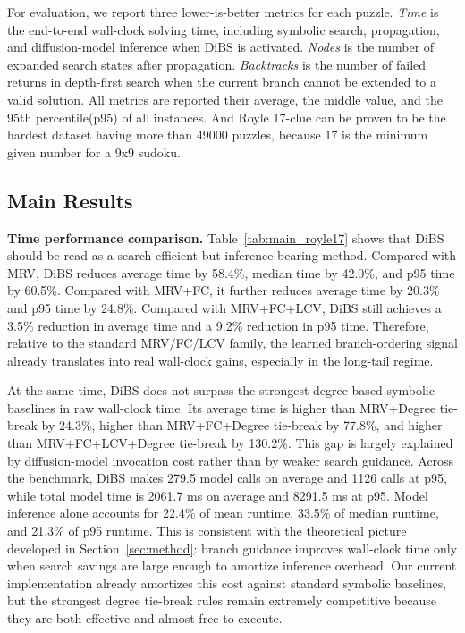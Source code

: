 \documentclass[lettersize,journal]{IEEEtran}
\begin{document}
For evaluation, we report three lower-is-better metrics for each puzzle.
\textit{Time} is the end-to-end wall-clock solving time, including symbolic search, propagation, and diffusion-model inference when DiBS is activated.
\textit{Nodes} is the number of expanded search states after propagation.
\textit{Backtracks} is the number of failed returns in depth-first search when the current branch cannot be extended to a valid solution. All metrics are reported their average, the middle value, and the 95th percentile(p95) of all instances. And Royle 17-clue\cite{royle2005minimum} can be proven to be the hardest dataset having more than 49000 puzzles, because 17 is the minimum given number for a 9x9 sudoku.



\subsection{Main Results}

\textbf{Time performance comparison.} Table~\ref{tab:main_royle17} shows that DiBS should be read as a search-efficient but inference-bearing method.
Compared with MRV, DiBS reduces average time by 58.4\%, median time by 42.0\%, and p95 time by 60.5\%.
Compared with MRV+FC, it further reduces average time by 20.3\% and p95 time by 24.8\%.
Compared with MRV+FC+LCV, DiBS still achieves a 3.5\% reduction in average time and a 9.2\% reduction in p95 time.
Therefore, relative to the standard MRV/FC/LCV family, the learned branch-ordering signal already translates into real wall-clock gains, especially in the long-tail regime.

At the same time, DiBS does not surpass the strongest degree-based symbolic baselines in raw wall-clock time.
Its average time is higher than MRV+Degree tie-break by 24.3\%, higher than MRV+FC+Degree tie-break by 77.8\%, and higher than MRV+FC+LCV+Degree tie-break by 130.2\%.
This gap is largely explained by diffusion-model invocation cost rather than by weaker search guidance.
Across the benchmark, DiBS makes 279.5 model calls on average and 1126 calls at p95, while total model time is 2061.7 ms on average and 8291.5 ms at p95.
Model inference alone accounts for 22.4\% of mean runtime, 33.5\% of median runtime, and 21.3\% of p95 runtime.
This is consistent with the theoretical picture developed in Section~\ref{sec:method}: branch guidance improves wall-clock time only when search savings are large enough to amortize inference overhead.
Our current implementation already amortizes this cost against standard symbolic baselines, but the strongest degree tie-break rules remain extremely competitive because they are both effective and almost free to execute.
\end{document}
